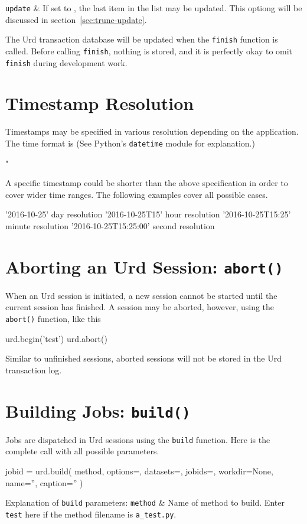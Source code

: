 \RPtwo \texttt{update} &  If set to \pyTrue, the last item in the list may be updated.
  This optiong will be discussed in section~\ref{sec:trunc-update}.\\[2ex]
\stoptabletwo

The Urd transaction database will be updated when the \texttt{finish}
function is called.  Before calling \texttt{finish}, nothing is
stored, and it is perfectly okay to omit \texttt{finish} during
development work.




\section{Timestamp Resolution}

Timestamps may be specified in various resolution depending on the
application.  The time format is (See Python's \texttt{datetime}
module for explanation.)
\begin{shell}
"%
\end{shell}
A specific timestamp could be shorter than the above specification in
order to cover wider time ranges.  The following examples cover all
possible cases.
\begin{python}
'2016-10-25'               day resolution
'2016-10-25T15'            hour resolution
'2016-10-25T15:25'         minute resolution
'2016-10-25T15:25:00'      second resolution
\end{python}



\section{Aborting an Urd Session:  \texttt{abort()}}

When an Urd session is initiated, a new session cannot be started
until the current session has finished.  A session may be aborted,
however, using the \texttt{abort()} function, like this
\begin{python}
urd.begin('test')
urd.abort()
\end{python}
Similar to unfinished sessions, aborted sessions will not be stored in
the Urd transaction log.




\section{Building Jobs: \texttt{build()}}

Jobs are dispatched in Urd sessions using the \texttt{build} function.
Here is the complete call with all possible parameters.
\begin{python}
jobid = urd.build(
    method,
    options={},
    datasets={},
    jobids={},
    workdir=None,
    name='',
    caption=''
)
\end{python}
Explanation of \texttt{build} parameters:
\starttabletwo
\RPtwo \texttt{method} & Name of method to build.  Enter \texttt{test}
    here if the method filename is \texttt{a\_test.py}.\\[2ex]
    
